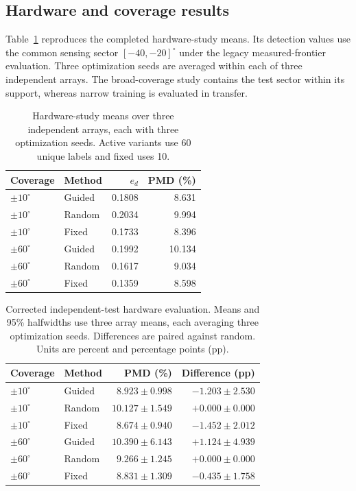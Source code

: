 \documentclass[conference]{IEEEtran}
\begin{document}
\subsection{Hardware and coverage results}
Table~\ref{tab:hardware-final} reproduces the completed hardware-study means. Its detection values use the common sensing sector $[-40,-20]^\circ$ under the legacy measured-frontier evaluation. Three optimization seeds are averaged within each of three independent arrays. The broad-coverage study contains the test sector within its support, whereas narrow training is evaluated in transfer.
\begin{table}[t]\centering\small
\caption{Hardware-study means over three independent arrays, each with three optimization seeds. Active variants use 60 unique labels and fixed uses 10.}\label{tab:hardware-final}
\setlength{\tabcolsep}{3pt}
\begin{tabular}{llrr}\toprule
Coverage & Method & $e_d$ & PMD (\%)\\\midrule
$\pm10^\circ$ & Guided & 0.1808 & 8.631\\
$\pm10^\circ$ & Random & 0.2034 & 9.994\\
$\pm10^\circ$ & Fixed & 0.1733 & 8.396\\
$\pm60^\circ$ & Guided & 0.1992 & 10.134\\
$\pm60^\circ$ & Random & 0.1617 & 9.034\\
$\pm60^\circ$ & Fixed & 0.1359 & 8.598\\
\bottomrule\end{tabular}
\end{table}
\begin{table}[t]\centering\small
\caption{Corrected independent-test hardware evaluation. Means and 95\% halfwidths use three array means, each averaging three optimization seeds. Differences are paired against random. Units are percent and percentage points (pp).}\label{tab:hardware-independent}
\setlength{\tabcolsep}{3pt}
\begin{tabular}{llrr}\toprule
Coverage & Method & PMD (\%) & Difference (pp)\\\midrule
$\pm10^\circ$ & Guided & $8.923\pm0.998$ & $-1.203\pm2.530$\\
$\pm10^\circ$ & Random & $10.127\pm1.549$ & $+0.000\pm0.000$\\
$\pm10^\circ$ & Fixed & $8.674\pm0.940$ & $-1.452\pm2.012$\\
$\pm60^\circ$ & Guided & $10.390\pm6.143$ & $+1.124\pm4.939$\\
$\pm60^\circ$ & Random & $9.266\pm1.245$ & $+0.000\pm0.000$\\
$\pm60^\circ$ & Fixed & $8.831\pm1.309$ & $-0.435\pm1.758$\\
\bottomrule\end{tabular}
\end{table}
\end{document}
